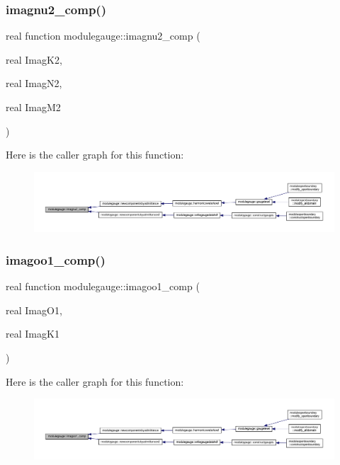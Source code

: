 \subsubsection{\texorpdfstring{imagnu2\+\_\+comp()}{imagnu2\_comp()}}
{\footnotesize\ttfamily real function modulegauge\+::imagnu2\+\_\+comp (\begin{DoxyParamCaption}\item[{real}]{Imag\+K2,  }\item[{real}]{Imag\+N2,  }\item[{real}]{Imag\+M2 }\end{DoxyParamCaption})\hspace{0.3cm}{\ttfamily [private]}}

Here is the caller graph for this function\+:\nopagebreak
\begin{figure}[H]
\begin{center}
\leavevmode
\includegraphics[width=350pt]{namespacemodulegauge_a63b14124c79ff7d860721610832a3ef5_icgraph}
\end{center}
\end{figure}
\mbox{\label{namespacemodulegauge_a2916ed439bb6cf0eacf5070d3fc179d7}} 
\subsubsection{\texorpdfstring{imagoo1\+\_\+comp()}{imagoo1\_comp()}}
{\footnotesize\ttfamily real function modulegauge\+::imagoo1\+\_\+comp (\begin{DoxyParamCaption}\item[{real}]{Imag\+O1,  }\item[{real}]{Imag\+K1 }\end{DoxyParamCaption})\hspace{0.3cm}{\ttfamily [private]}}

Here is the caller graph for this function\+:\nopagebreak
\begin{figure}[H]
\begin{center}
\leavevmode
\includegraphics[width=350pt]{namespacemodulegauge_a2916ed439bb6cf0eacf5070d3fc179d7_icgraph}
\end{center}
\end{figure}
\mbox{\label{namespacemodulegauge_a45d6d9badd92c973e90b945525d4c23e}} 
